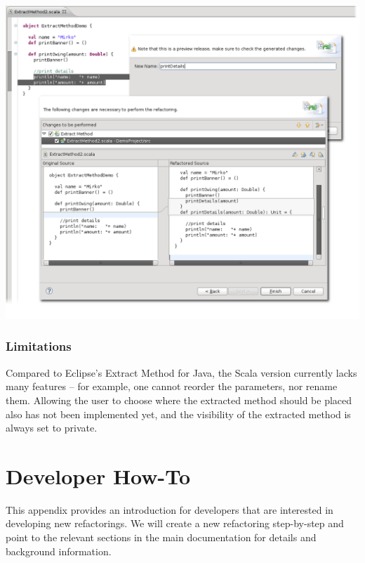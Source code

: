 \documentclass[10pt,a4paper,oneside]{scrreprt}
\begin{document}
\begin{center}
  \includegraphics[width=\linewidth]{extract_method_screenshot_1.png}
\end{center}

\subsection{Limitations}

Compared to Eclipse's Extract Method for Java, the Scala version currently lacks many features -- for example, one cannot reorder the parameters, nor rename them. Allowing the user to choose where the extracted method should be placed also has not been implemented yet, and the visibility of the extracted method is always set to private.

\label{end-chapter:user-guide}

\chapter{Developer How-To} \label{chapter:developer-how-to}

This appendix provides an introduction for developers that are interested in developing new refactorings. We will create a new refactoring step-by-step and point to the relevant sections in the main documentation for details and background information. 

\end{document}
